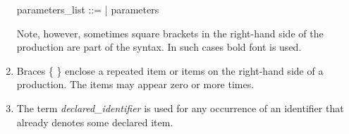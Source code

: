 \begin{enumerate}[label=\alph*)]
		\begin{bnf}
			parameters\_list ::= \tbf{(} \tbf{)} | \tbf{(} parameters \tbf{)}
		\end{bnf}

		Note, however, sometimes square brackets in the right-hand side of the production are part of the syntax.
		In such cases bold font is used.
	\item
		Braces \{ \} enclose a repeated item or items on the right-hand side of a production.
		The items may appear zero or more times.
	\item
		The term \textit{declared\_identifier} is used for any occurrence of an identifier that already denotes some declared item.
\end{enumerate}
